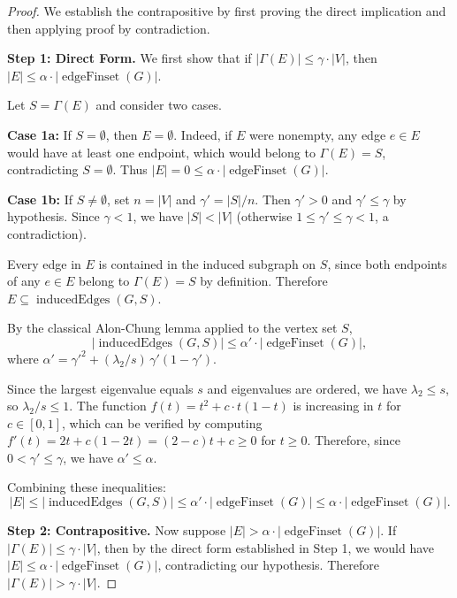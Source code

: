 \documentclass[11pt]{article}
\theoremstyle{plain}
\theoremstyle{definition}
\theoremstyle{remark}
\begin{document}
\begin{proof}
We establish the contrapositive by first proving the direct implication and then applying proof by contradiction.

\textbf{Step 1: Direct Form.} We first show that if $|\Gamma(E)| \leq \gamma \cdot |V|$, then $|E| \leq \alpha \cdot |\operatorname{edgeFinset}(G)|$.

Let $S = \Gamma(E)$ and consider two cases.

\textbf{Case 1a:} If $S = \emptyset$, then $E = \emptyset$. Indeed, if $E$ were nonempty, any edge $e \in E$ would have at least one endpoint, which would belong to $\Gamma(E) = S$, contradicting $S = \emptyset$. Thus $|E| = 0 \leq \alpha \cdot |\operatorname{edgeFinset}(G)|$.

\textbf{Case 1b:} If $S \neq \emptyset$, set $n = |V|$ and $\gamma' = |S|/n$. Then $\gamma' > 0$ and $\gamma' \leq \gamma$ by hypothesis. Since $\gamma < 1$, we have $|S| < |V|$ (otherwise $1 \leq \gamma' \leq \gamma < 1$, a contradiction).

Every edge in $E$ is contained in the induced subgraph on $S$, since both endpoints of any $e \in E$ belong to $\Gamma(E) = S$ by definition. Therefore $E \subseteq \operatorname{inducedEdges}(G, S)$.

By the classical Alon-Chung lemma applied to the vertex set $S$,
\[
|\operatorname{inducedEdges}(G,S)| \leq \alpha' \cdot |\operatorname{edgeFinset}(G)|,
\]
where $\alpha' = {\gamma'}^2 + (\lambda_2/s)\,\gamma'(1-\gamma')$.

Since the largest eigenvalue equals $s$ and eigenvalues are ordered, we have $\lambda_2 \leq s$, so $\lambda_2/s \leq 1$. The function $f(t) = t^2 + c \cdot t(1-t)$ is increasing in $t$ for $c \in [0,1]$, which can be verified by computing $f'(t) = 2t + c(1-2t) = (2-c)t + c \geq 0$ for $t \geq 0$. Therefore, since $0 < \gamma' \leq \gamma$, we have $\alpha' \leq \alpha$.

Combining these inequalities:
\[
|E| \leq |\operatorname{inducedEdges}(G,S)| \leq \alpha' \cdot |\operatorname{edgeFinset}(G)| \leq \alpha \cdot |\operatorname{edgeFinset}(G)|.
\]

\textbf{Step 2: Contrapositive.} Now suppose $|E| > \alpha \cdot |\operatorname{edgeFinset}(G)|$. If $|\Gamma(E)| \leq \gamma \cdot |V|$, then by the direct form established in Step 1, we would have $|E| \leq \alpha \cdot |\operatorname{edgeFinset}(G)|$, contradicting our hypothesis. Therefore $|\Gamma(E)| > \gamma \cdot |V|$.
\end{proof}
\end{document}
